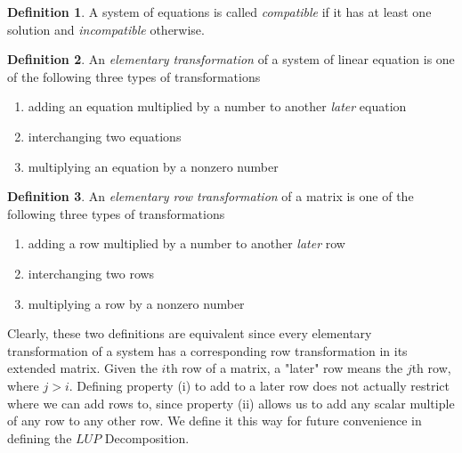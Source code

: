 \documentclass{article}
\theoremstyle{remark}
\theoremstyle{definition}
\newtheorem{definition}{Definition}[section]
\begin{document}
\begin{definition}
A system of equations is called \textit{compatible} if it has at least one solution and \textit{incompatible} otherwise. 
\end{definition}

\begin{definition}
An \textit{elementary transformation} of a system of linear equation is one of the following three types of transformations
\begin{enumerate}
    \item adding an equation multiplied by a number to another \textit{later} equation
    \item interchanging two equations
    \item multiplying an equation by a nonzero number
\end{enumerate}
\end{definition}

\begin{definition}
An \textit{elementary row transformation} of a matrix is one of the following three types of transformations
\begin{enumerate}
    \item adding a row multiplied by a number to another \textit{later} row
    \item interchanging two rows
    \item multiplying a row by a nonzero number
\end{enumerate}
\end{definition}

Clearly, these two definitions are equivalent since every elementary transformation of a system has a corresponding row transformation in its extended matrix. Given the $i$th row of a matrix, a "later" row means the $j$th row, where $j > i$. Defining property (i) to add to a later row does not actually restrict where we can add rows to, since property (ii) allows us to add any scalar multiple of any row to any other row. We define it this way for future convenience in defining the $L U P$ Decomposition. 
\end{document}
